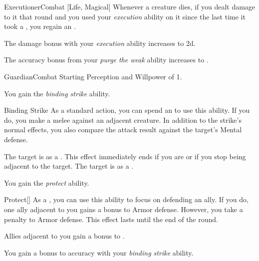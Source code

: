 \begin{feat}{Executioner}{Combat}
        [Life, Magical] Whenever a creature dies, if you dealt damage to it that round and you used your \textit{execution} ability on it since the last time it took a , you regain an .

         The damage bonus with your \textit{execution} ability increases to \plus2d.

         The accuracy bonus from your \textit{purge the weak} ability increases to .
    \end{feat}

    \begin{feat}{Guardian}{Combat}
        \featpre Starting Perception and Willpower of 1.

         You gain the \textit{binding strike} ability.
        \begin{ability}{Binding Strike}
            As a standard action, you can spend an  to use this ability.
            If you do, you make a melee  against an adjacent creature.
            In addition to the strike's normal effects, you also compare the attack result against the target's Mental defense.

            \hit The target is  as a .
            This effect immediately ends if you are  or if you stop being adjacent to the target.
            \crit The target is  as a .
        \end{ability}

         You gain the \textit{protect} ability.
        \begin{ability}{Protect}[]
            As a , you can use this ability to focus on defending an ally.
            If you do, one ally adjacent to you gains a  bonus to Armor defense.
            However, you take a  penalty to Armor defense.
            This effect lasts until the end of the round.
        \end{ability}

         Allies adjacent to you gain a  bonus to .

         You gain a  bonus to accuracy with your \textit{binding strike} ability.


\end{feat}
